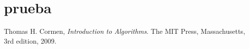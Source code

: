 \documentclass[a4paper, 11pt]{article}
\begin{document}
\pagestyle{myheadings}
\maketitle

\thispagestyle{empty}
\tableofcontents

\newpage
\section{prueba}



\newpage
\begin{thebibliography}{11}

  Thomas H. Cormen,
  \emph{Introduction to Algorithms}.
  The MIT Press, Massachusetts,
  3rd edition,
  2009.

\end{thebibliography}
%
%
\end{document}
